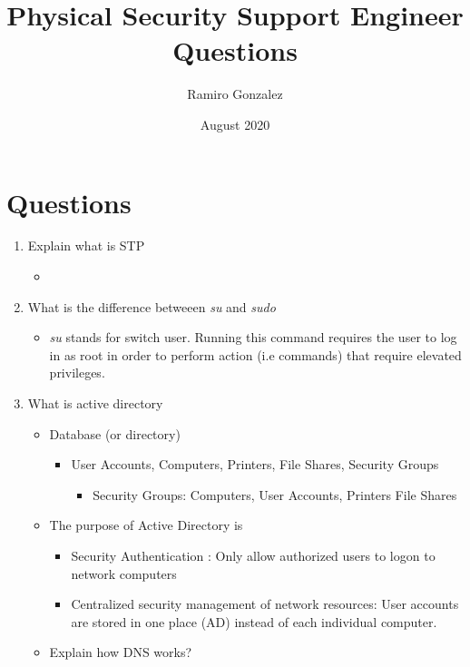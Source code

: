 \documentclass{article}
\title{Physical Security Support Engineer Questions}
\author{Ramiro Gonzalez}
\date{August 2020}
\begin{document}
\maketitle
\section{Questions} 
\begin{enumerate}
    \item Explain what is STP
    \begin{itemize}
        \item 
    \end{itemize}
    \item What is the difference betweeen \textit{su} and \textit{sudo} 
    \begin{itemize}
        \item \textit{su} stands for switch user. Running this command requires the user to log in as root in order to perform action (i.e commands) that require elevated privileges. 
    \end{itemize}
    \item What is active directory 
    \begin{itemize}
        \item Database (or directory) 
        \begin{itemize}
            \item User Accounts, Computers, Printers, File Shares, Security Groups 
            \begin{itemize}
                \item Security Groups: Computers, User Accounts, Printers File Shares
            \end{itemize}
        \end{itemize}
        \item The purpose of  Active Directory is 
        \begin{itemize}
            \item Security Authentication : Only allow authorized users to logon to network computers
            \item Centralized security management of network resources: User accounts are stored in one place (AD) instead of each individual computer. 
        \end{itemize}
        \item Explain how DNS works?   
    \end{itemize}
\end{enumerate}
\end{document}
